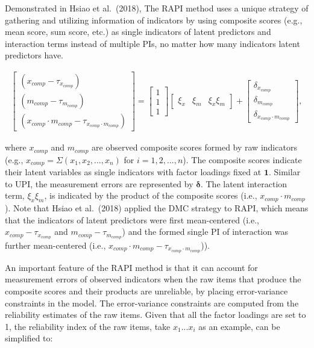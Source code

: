 \documentclass[
  man]{apa7}
\begin{document}
Demonstrated in Hsiao et al.~(2018), The RAPI method uses a unique strategy of gathering and utilizing information of indicators by using composite scores (e.g., mean score, sum score, etc.) as single indicators of latent predictors and interaction terms instead of multiple PIs, no matter how many indicators latent predictors have.

\begin{align}
    \begin{bmatrix}
        (x_{comp} - \tau_{x_{comp}}) \\
        (m_{comp} - \tau_{m_{comp}}) \\
        (x_{comp} \cdot m_{comp} - \tau_{x_{comp} \cdot m_{comp}})
    \end{bmatrix} = 
    \begin{bmatrix}
        1 \\
        1 \\ 
        1 
    \end{bmatrix}
    \begin{bmatrix}
        \xi_{x} & \xi_{m} & \xi_{x}\xi_{m}
    \end{bmatrix} +
    \begin{bmatrix}
        \delta_{x_{comp}} \\
        \delta_{m_{comp}} \\ 
        \delta_{x_{comp} \cdot m_{comp}}
    \end{bmatrix},
\end{align}

where \(x_{comp}\) and \(m_{comp}\) are observed composite scores formed by raw indicators (e.g., \(x_{comp} = \Sigma(x_{1}, x_{2}, ..., x_{n})\) for \(i = 1, 2, ..., n\)). The composite scores indicate their latent variables as single indicators with factor loadings fixed at \(\textbf{1}\). Similar to UPI, the measurement errors are represented by \(\mathbf{\delta}\). The latent interaction term, \(\xi_{x}\xi_{m}\), is indicated by the product of the composite scores (i.e., \(x_{comp} \cdot m_{comp}\)). Note that Hsiao et al.~(2018) applied the DMC strategy to RAPI, which means that the indicators of latent predictors were first mean-centered (i.e., \(x_{comp} - \tau_{x_{comp}}\) and \(m_{comp} - \tau_{m_{comp}}\)) and the formed single PI of interaction was further mean-centered (i.e., \(x_{comp} \cdot m_{comp} - \tau_{x_{comp} \cdot m_{comp}}\))).

An important feature of the RAPI method is that it can account for measurement errors of observed indicators when the raw items that produce the composite scores and their products are unreliable, by placing error-variance constraints in the model. The error-variance constraints are computed from the reliability estimates of the raw items. Given that all the factor loadings are set to 1, the reliability index of the raw items, take \(x_{1} ...x_{i}\) as an example, can be simplified to:
\end{document}
